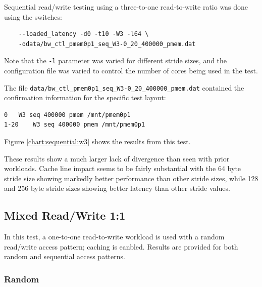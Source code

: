 Sequential read/write testing using a three-to-one read-to-write ratio was 
done using the switches:

\begin{verbatim}
    --loaded_latency -d0 -t10 -W3 -l64 \
    -odata/bw_ctl_pmem0p1_seq_W3-0_20_400000_pmem.dat
\end{verbatim}

Note that the \verb+-l+ parameter was varied for different
stride sizes, and the configuration file was varied to control
the number of cores being used in the test.

The file \verb+data/bw_ctl_pmem0p1_seq_W3-0_20_400000_pmem.dat+ contained the confirmation information
for the specific test layout:

\begin{verbatim}
0	W3 seq 400000 pmem /mnt/pmem0p1
1-20	W3 seq 400000 pmem /mnt/pmem0p1
\end{verbatim}

Figure \ref{chart:sequential:w3} shows the results from this test.

These results show a much larger lack of divergence than seen with
prior workloads.  Cache line impact seems to be fairly
substantial with the 64 byte stride size showing markedly better
performance than other stride sizes, while 128 and 256 byte stride
sizes showing better latency than other stride values. 

\subsection{Mixed Read/Write 1:1}

In this test, a one-to-one read-to-write workload is used with
a random read/write access pattern; caching is eanbled.
Results are provided for both random and sequential access
patterns.

\subsubsection{Random}

